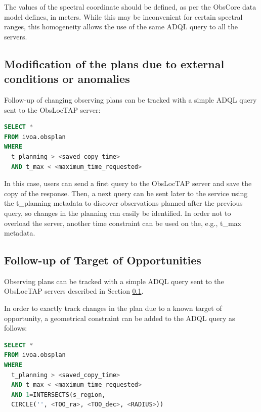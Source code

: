 \documentclass[11pt,a4paper]{ivoa}
\begin{document}
The values of the spectral coordinate should be defined, as per the ObsCore data
model defines, in meters. While this may be inconvenient for certain spectral
ranges, this homogeneity allows the use of the same ADQL query to all the
servers.

\subsection{Modification of the plans due to external conditions or anomalies}
\label{sec:UseCaseModPlans}
Follow-up of changing observing plans can be tracked with a simple ADQL query
sent to the ObsLocTAP server:


\begin{lstlisting}[language=SQL]
SELECT * 
FROM ivoa.obsplan
WHERE
  t_planning > <saved_copy_time>
  AND t_max < <maximum_time_requested>
\end{lstlisting}
In this case, users can send a first query to the ObsLocTAP server and save the
copy of the response. Then, a next query can be sent later to the service using
the t\_planning metadata to discover observations planned after the previous
query, so changes in the planning can easily be identified. In order not to
overload the server, another time constraint can be used on the, e.g., t\_max
metadata.
\par

\subsection{Follow-up of Target of Opportunities}
Observing plans can be tracked with a simple ADQL query sent to the ObsLocTAP
servers described in Section \ref{sec:UseCaseModPlans}.
\par

In order to exactly track changes in the plan due to a known target of
opportunity, a geometrical constraint can be added to the ADQL query as follows:

\begin{lstlisting}[language=SQL]
SELECT *
FROM ivoa.obsplan
WHERE
  t_planning > <saved_copy_time>
  AND t_max < <maximum_time_requested>
  AND 1=INTERSECTS(s_region, 
  CIRCLE('', <TOO_ra>, <TOO_dec>, <RADIUS>))
\end{lstlisting}
\end{document}
